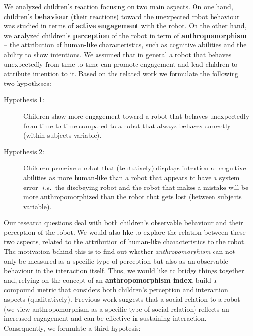 \documentclass{sig-alternate}
\newcommand{\ie}{{\textit{i.e.~}}}
\begin{document}
We analyzed children's reaction focusing on two main aspects. On one hand,
children's \textbf{behaviour} (their reactions) toward the unexpected robot
behaviour was studied in terms of \textbf{active engagement} with the robot. On
the other hand, we analyzed children's \textbf{perception} of the robot in term
of \textbf{anthropomorphism} -- the attribution of human-like characteristics,
such as cognitive abilities and the ability to show intentions. We assumed that
in general a robot that behaves unexpectedly from time to time can promote
engagement and lead children to attribute intention to it. Based
on the related work we formulate the following two hypotheses:

\begin{description}

    \item[Hypothesis 1:] Children show more engagement toward a robot that
        behaves unexpectedly from time to time compared to a robot that always
        behaves correctly (within subjects variable).

    \item[Hypothesis 2:] Children perceive a robot that (tentatively) displays
        intention or cognitive abilities as more human-like than a robot that
        appears to have a system error, \ie the disobeying robot and the robot
        that makes a mistake will be more anthropomorphized than the robot that
        gets lost (between subjects variable).

\end{description}

Our research questions deal with both children's observable behaviour and their
perception of the robot. We would also like to explore the relation between
these two aspects, related to the attribution of human-like characteristics to
the robot. The motivation behind this is to find out whether
\textit{anthropomorphism} can not only be measured as a specific type of
perception but also as an observable behaviour in the interaction itself. Thus,
we would like to bridge things together and, relying on the concept of an
\textbf{anthropomorphism index}, build a
compound metric that considers both children's perception and interaction
aspects (qualitatively). Previous work suggests that a social relation to a
robot (we view anthropomorphism as a specific type of social relation) reflects
an increased engagement and can be effective in sustaining interaction.
Consequently, we formulate a third hypotesis:
\end{document}
